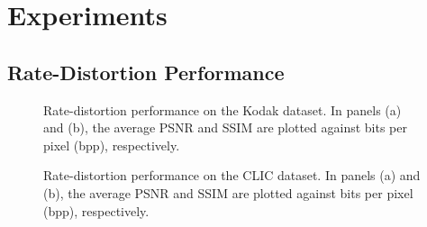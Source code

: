 \section{Experiments} \label{sec: experiments}


\subsection{Rate-Distortion Performance} \label{sec: rate-distortion Performance}



\begin{figure}[t]
	\centering
	\begin{subfigure}{.5\textwidth}
		\centering
		\caption{}
		\label{fig: psnr-vs-bpp kodak}
	\end{subfigure}%
	\begin{subfigure}{.5\textwidth}
		\centering
		\caption{}
		\label{fig: ssim-vs-bpp kodak}
	\end{subfigure}
	\caption{Rate-distortion performance on the Kodak dataset. In panels (a) and (b), the average PSNR and SSIM are plotted against bits per pixel (bpp), respectively.}
	\label{fig: compression performance on kodak}
\end{figure}

\begin{figure}[t]
	\centering
	\begin{subfigure}{.5\textwidth}
		\centering
		\caption{}
		\label{fig: psnr-vs-bpp clic}
	\end{subfigure}%
	\begin{subfigure}{.5\textwidth}
		\centering
		\caption{}
		\label{fig: ssim-vs-bpp clic}
	\end{subfigure}
	\caption{Rate-distortion performance on the CLIC dataset. In panels (a) and (b), the average PSNR and SSIM are plotted against bits per pixel (bpp), respectively.}
	\label{fig: compression performance on clic}
\end{figure}


